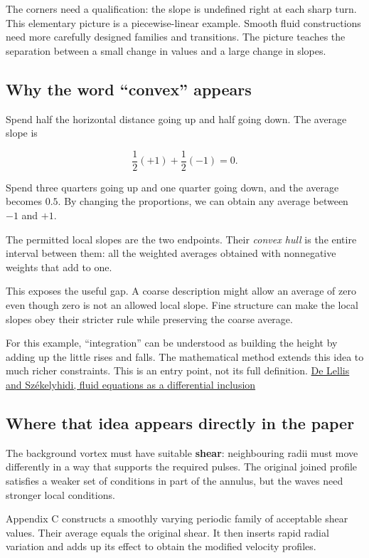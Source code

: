 \documentclass[
  english,
  11pt,
]{article}
\begin{document}
The corners need a qualification: the slope is undefined right at each
sharp turn. This elementary picture is a piecewise-linear example.
Smooth fluid constructions need more carefully designed families and
transitions. The picture teaches the separation between a small change
in values and a large change in slopes.

\subsection{Why the word ``convex''
appears}\label{why-the-word-convex-appears}

Spend half the horizontal distance going up and half going down. The
average slope is

\[
\frac12(+1)+\frac12(-1)=0.
\]

Spend three quarters going up and one quarter going down, and the
average becomes \(0.5\). By changing the proportions, we can obtain any
average between \(-1\) and \(+1\).

The permitted local slopes are the two endpoints. Their \emph{convex
hull} is the entire interval between them: all the weighted averages
obtained with nonnegative weights that add to one.

This exposes the useful gap. A coarse description might allow an average
of zero even though zero is not an allowed local slope. Fine structure
can make the local slopes obey their stricter rule while preserving the
coarse average.

For this example, ``integration'' can be understood as building the
height by adding up the little rises and falls. The mathematical method
extends this idea to much richer constraints. This is an entry point,
not its full definition. \href{https://arxiv.org/abs/math/0702079}{De
Lellis and Székelyhidi, fluid equations as a differential inclusion}

\subsection{Where that idea appears directly in the
paper}\label{where-that-idea-appears-directly-in-the-paper}

The background vortex must have suitable \textbf{shear}: neighbouring
radii must move differently in a way that supports the required pulses.
The original joined profile satisfies a weaker set of conditions in part
of the annulus, but the waves need stronger local conditions.

Appendix C constructs a smoothly varying periodic family of acceptable
shear values. Their average equals the original shear. It then inserts
rapid radial variation and adds up its effect to obtain the modified
velocity profiles.
\end{document}

